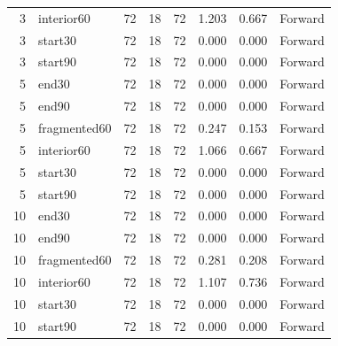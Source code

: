\begin{table}
{\begin{tabular}{rlrrrrrl}
3 & interior60 & 72 & 18 & 72 & 1.203 & 0.667 & Forward \\
3 & start30 & 72 & 18 & 72 & 0.000 & 0.000 & Forward \\
3 & start90 & 72 & 18 & 72 & 0.000 & 0.000 & Forward \\
5 & end30 & 72 & 18 & 72 & 0.000 & 0.000 & Forward \\
5 & end90 & 72 & 18 & 72 & 0.000 & 0.000 & Forward \\
5 & fragmented60 & 72 & 18 & 72 & 0.247 & 0.153 & Forward \\
5 & interior60 & 72 & 18 & 72 & 1.066 & 0.667 & Forward \\
5 & start30 & 72 & 18 & 72 & 0.000 & 0.000 & Forward \\
5 & start90 & 72 & 18 & 72 & 0.000 & 0.000 & Forward \\
10 & end30 & 72 & 18 & 72 & 0.000 & 0.000 & Forward \\
10 & end90 & 72 & 18 & 72 & 0.000 & 0.000 & Forward \\
10 & fragmented60 & 72 & 18 & 72 & 0.281 & 0.208 & Forward \\
10 & interior60 & 72 & 18 & 72 & 1.107 & 0.736 & Forward \\
10 & start30 & 72 & 18 & 72 & 0.000 & 0.000 & Forward \\
10 & start90 & 72 & 18 & 72 & 0.000 & 0.000 & Forward \\
\bottomrule
\end{tabular}
}
\end{table}

\begin{table}
\caption{Target calibration budget sensitivity for the original frozen score on the unchanged Swiss test pool. Budgets count independent calibration groups. Means and ranges span enumerated or fixed-seed sampled subsets, not new independent test repetitions. No subset certifies positive admission under the formal rule.}
\label{tab:followup_calibration_budget}
\centering
\scriptsize
{}
\end{table}

